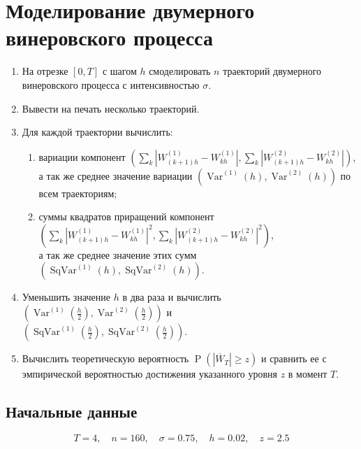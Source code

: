 \documentclass[14pt,a4paper]{scrartcl}
\begin{document}
\section*{Моделирование двумерного винеровского процесса}
\begin{enumerate}
	\item На отрезке $[0,T]$ с шагом $h$ смоделировать $n$ траекторий двумерного винеровского процесса с интенсивностью $\sigma$.
	\item Вывести на печать несколько траекторий.
	\item Для каждой траектории вычислить:
		\begin{enumerate}[label*=\arabic*]
			\item вариации компонент $\left(\sum\limits_{k}\left|W_{(k+1) h}^{(1)}-W_{k h}^{(1)}\right|, \sum\limits_{k}\left|W_{(k+1) h}^{(2)}-W_{k h}^{(2)}\right|\right)$,\\
			а так же среднее значение вариации $\left(\operatorname{Var}^{(1)}(h), \operatorname{Var}^{(2)}(h)\right)$ по всем траекториям;
			\item суммы квадратов приращений компонент \\ $\left(\sum\limits_{k}\left|W_{(k+1) h}^{(1)}-W_{k h}^{(1)}\right|^2, \sum\limits_{k}\left|W_{(k+1) h}^{(2)}-W_{k h}^{(2)}\right|^2\right)$, \\
			а так же среднее значение этих сумм $(\operatorname{SqVar}^{(1)}(h), \operatorname{SqVar}^{(2)}(h))$.
		\end{enumerate}
	\item Уменьшить значение $h$ в два раза и вычислить $\left(\operatorname{Var}^{(1)}(\frac{h}{2}), \operatorname{Var}^{(2)}(\frac{h}{2})\right)$ и \\
		$(\operatorname{SqVar}^{(1)}(\frac{h}{2}), \operatorname{SqVar}^{(2)}(\frac{h}{2}))$.
	\item Вычислить теоретическую вероятность $\operatorname{P}(|\overline{W}_T| \geq z)$ и сравнить ее с эмпирической вероятностью достижения указанного уровня $z$ в момент $T$.
\end{enumerate}


\subsection*{Начальные данные}
\begin{equation*}
	T = 4, \quad n = 160, \quad \sigma = 0.75, \quad h = 0.02, \quad z = 2.5
\end{equation*}


\pagebreak
\end{document}
